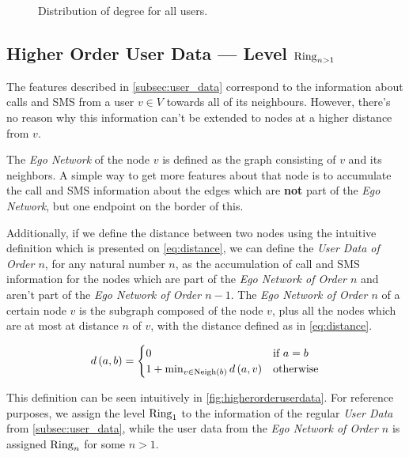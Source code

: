 \begin{figure}
\caption{Distribution of degree for all users.}
\label{fig:contacts}
\end{figure}

\subsection{Higher Order User Data --- Level $\operatorname{Ring}_{n > 1}$}

\label{subsec:higherorderuserdata}

The features described in \cref{subsec:user_data} correspond to the information about calls and SMS from a user $v \in V$ towards all of its neighbours. However, there's no reason why this information can't be extended to nodes at a higher distance from $v$.

The \emph{Ego Network} of the node $v$ is defined as the graph consisting of $v$ and its neighbors. A simple way to get more features about that node is to accumulate the call and SMS information about the edges which are \textbf{not} part of the \emph{Ego Network}, but one endpoint on the border of this.

Additionally, if we define the distance between two nodes using the intuitive definition which is presented on \cref{eq:distance}, we can define the \emph{User Data of Order $n$}, for any natural number $n$, as the accumulation of call and SMS information for the nodes which are part of the \emph{Ego Network of Order $n$} and aren't part of the \emph{Ego Network of Order $n - 1$}. The \emph{Ego Network of Order $n$} of a certain node $v$ is the subgraph composed of the node $v$, plus all the nodes which are at most at distance $n$ of $v$, with the distance defined as in \cref{eq:distance}.

\begin{equation}
d \left( a, b \right) =
\begin{cases}
	0 & \text{if } a = b \\
	1 + \min_{v \in \operatorname{Neigh} \left(b \right)} d \left( a, v \right) & \text{otherwise}
\end{cases}
\label{eq:distance}
\end{equation}



This definition can be seen intuitively in \cref{fig:higherorderuserdata}. For reference purposes, we assign the level $\operatorname{Ring}_1$ to the information of the regular \emph{User Data} from \cref{subsec:user_data}, while the user data from the \emph{Ego Network of Order $n$} is assigned $\operatorname{Ring}_n$ for some $n > 1$\footnotemark{}.

